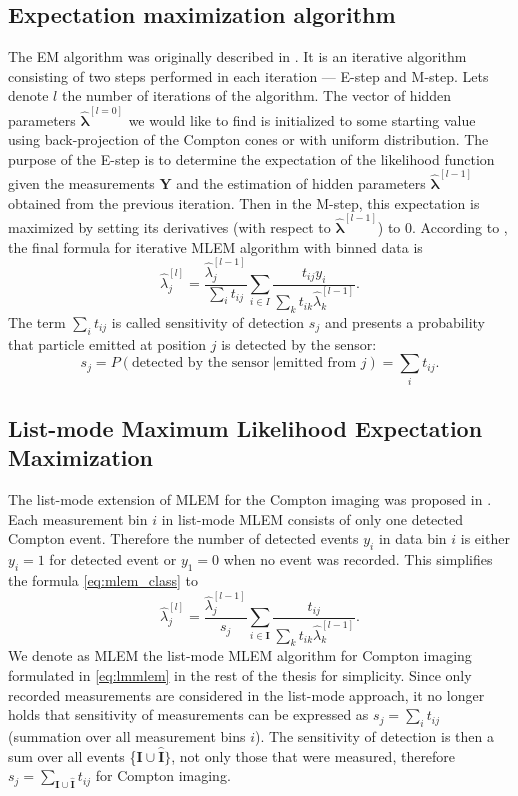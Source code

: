 \subsection{Expectation maximization algorithm}
The \ac{EM} algorithm was originally described in \cite{EM}. 
It is an iterative algorithm consisting of two steps performed in each iteration --- E-step and M-step.
Lets denote $l$ the number of iterations of the algorithm.
The vector of hidden parameters  $\mathbf{\hat{\lambda}}^{[l = 0]}$ we would like to find is initialized to some starting value using back-projection of the Compton cones or with uniform distribution.
The purpose of the E-step is to determine the expectation of the likelihood function given the measurements $\mathbf{Y}$ and the estimation of hidden parameters $\mathbf{\hat{\lambda}}^{[l-1]}$ obtained from the previous iteration. 
Then in the M-step, this expectation is maximized by setting its derivatives (with respect to $\mathbf{\hat{\lambda}}^{[l-1]}$) to $0$.
According to \cite{MLEM_Lange_Carlson_1984}, the final formula for iterative \ac{MLEM} algorithm with binned data is 
\begin{equation}
  \hat{\lambda}_{j}^{[l]} = \frac{\hat{\lambda}_{j}^{[l-1]}}{\sum_{i}t_{ij}} \sum_{i \in I} \frac{t_{ij} y_{i}}{\sum_{k} t_{ik} \hat{\lambda}_{k}^{[l-1]}}.
  \label{eq:mlem_class}
\end{equation}
The term $\sum_{i}t_{ij}$ is called sensitivity of detection $s_{j}$ and presents a probability that particle emitted at position $j$ is detected by the sensor:
\begin{equation}
  s_{j} = P(\textrm{detected by the sensor}\ | \textrm{emitted from } j) =  \sum_{i}t_{ij}.
\end{equation}
\subsection{List-mode Maximum Likelihood Expectation Maximization}
The list-mode extension of \ac{MLEM} for the Compton imaging was proposed in \cite{wilderman}.
Each measurement bin $i$ in list-mode \ac{MLEM} consists of only one detected Compton event.
Therefore the number of detected events $y_{i}$ in data bin $i$ is either $y_{i} = 1$ for detected event or $y_{1} = 0$ when no event was recorded.
This simplifies the formula \ref{eq:mlem_class} to
\begin{equation}
  \hat{\lambda}_{j}^{[l]} = \frac{\hat{\lambda}_{j}^{[l-1]}}{s_{j}} \sum_{i \in \mathbf{I}}\frac{t_{ij} }{\sum_{k} t_{ik} \hat{\lambda}_{k}^{[l-1]}}.
  \label{eq:lmmlem}
\end{equation}
We denote as \ac{MLEM} the list-mode \ac{MLEM} algorithm for Compton imaging formulated in \ref{eq:lmmlem} in the rest of the thesis for simplicity.
Since only recorded measurements are considered in the list-mode approach, it no longer holds that sensitivity of measurements can be expressed as $s_{j} = \sum_{i}t_{ij}$ (summation over all measurement bins $i$).
The sensitivity of detection is then a sum over all events \{$\mathbf{I} \cup \mathbf{\hat{I}}\}$, not only those that were measured, therefore $s_{j} = \sum_{\mathbf{I} \cup \mathbf{\hat{I}}} t_{ij}$ for Compton imaging.
